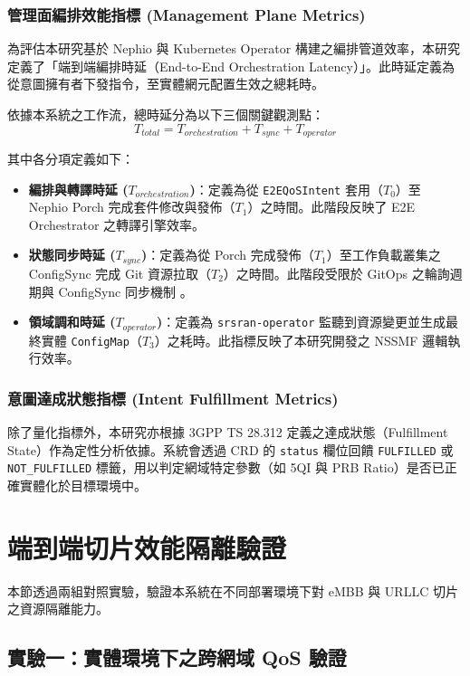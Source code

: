 \subsubsection{管理面編排效能指標 (Management Plane Metrics)}
為評估本研究基於 Nephio 與 Kubernetes Operator 構建之編排管道效率，本研究定義了「端到端編排時延（End-to-End Orchestration Latency）」。此時延定義為從意圖擁有者下發指令，至實體網元配置生效之總耗時。

依據本系統之工作流，總時延分為以下三個關鍵觀測點：
\begin{equation}
    T_{total} = T_{orchestration} + T_{sync} + T_{operator}
\end{equation}

其中各分項定義如下：
\begin{itemize}
    \item \textbf{編排與轉譯時延 ($T_{orchestration}$)}：定義為從 \texttt{E2EQoSIntent} 套用（$T_0$）至 Nephio Porch 完成套件修改與發佈（$T_1$）之時間。此階段反映了 E2E Orchestrator 之轉譯引擎效率。
    \item \textbf{狀態同步時延 ($T_{sync}$)}：定義為從 Porch 完成發佈（$T_1$）至工作負載叢集之 ConfigSync 完成 Git 資源拉取（$T_2$）之時間。此階段受限於 GitOps 之輪詢週期與 ConfigSync 同步機制 \cite{google_config_sync,cncf_gitops_2025}。
    \item \textbf{領域調和時延 ($T_{operator}$)}：定義為 \texttt{srsran-operator} 監聽到資源變更並生成最終實體 \texttt{ConfigMap}（$T_3$）之耗時。此指標反映了本研究開發之 NSSMF 邏輯執行效率。
\end{itemize}

\subsubsection{意圖達成狀態指標 (Intent Fulfillment Metrics)}
除了量化指標外，本研究亦根據 3GPP TS 28.312 定義之達成狀態（Fulfillment State）作為定性分析依據。系統會透過 CRD 的 \texttt{status} 欄位回饋 \texttt{FULFILLED} 或 \texttt{NOT\_FULFILLED} 標籤，用以判定網域特定參數（如 5QI 與 PRB Ratio）是否已正確實體化於目標環境中。

\section{端到端切片效能隔離驗證}
\label{sec:slice_performance}
本節透過兩組對照實驗，驗證本系統在不同部署環境下對 eMBB 與 URLLC 切片之資源隔離能力。

\subsection{實驗一：實體環境下之跨網域 QoS 驗證}
\label{subsec:local_qos_verification}

